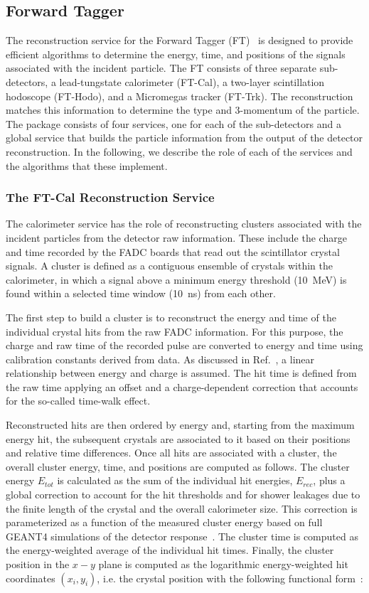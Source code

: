 \subsection{Forward Tagger}

The reconstruction service for the Forward Tagger (FT)~\cite{ft-nim} is designed to provide efficient algorithms
to determine the energy, time, and positions of the signals associated with the incident particle. The FT consists
of three separate sub-detectors, a lead-tungstate calorimeter (FT-Cal), a two-layer scintillation hodoscope
(FT-Hodo), and a Micromegas tracker (FT-Trk). The reconstruction matches this information to determine the type
and 3-momentum of the particle. The package consists of four services, one for each of the sub-detectors and a global
service that builds the particle information from the output of the detector reconstruction. In the following, we
describe the role of each of the services and the algorithms that these implement.

\subsubsection{The FT-Cal Reconstruction Service}

The calorimeter service has the role of reconstructing clusters associated with the incident particles from the
detector raw information. These include the charge and time recorded by the FADC boards that read out the
scintillator crystal signals. A cluster is defined as a contiguous ensemble of crystals within the calorimeter, in which
a signal above a minimum energy threshold (10~MeV) is found within a selected time window (10~ns) from each other.

The first step to build a cluster is to reconstruct the energy and time of the individual crystal hits from the raw
FADC information. For this purpose, the charge and raw time of the recorded pulse are converted to energy and
time using calibration constants derived from data. As discussed in Ref.~\cite{ft-nim}, a linear relationship between
energy and charge is assumed. The hit time is defined from the raw time applying an offset and a charge-dependent
correction that accounts for the so-called time-walk effect.

Reconstructed hits are then ordered by energy and, starting from the maximum energy hit, the subsequent
crystals are associated to it based on their positions and relative time differences. Once all hits are associated
with a cluster, the overall cluster energy, time, and positions are computed as follows. The cluster energy $E_{tot}$
is calculated as the sum of the individual hit energies, $E_{rec}$, plus a global correction to account for the hit
thresholds and for shower leakages due to the finite length of the crystal and the overall calorimeter size. This
correction is parameterized as a function of the measured cluster energy based on full GEANT4 simulations of the
detector response~\cite{ft-nim}. The cluster time is computed as the energy-weighted average of the individual hit
times. Finally, the cluster position in the $x-y$ plane is computed as the logarithmic energy-weighted hit
coordinates $(x_i,y_i)$, i.e. the crystal position with the following functional form~\cite{ic}:

